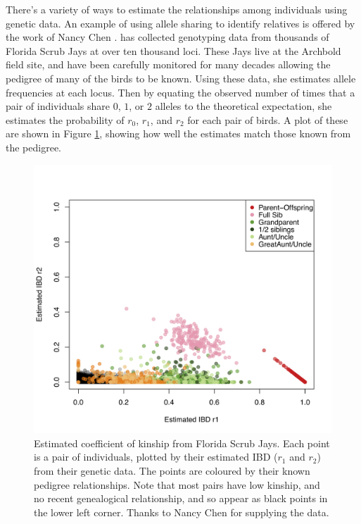 There's a variety of ways to estimate the relationships among
individuals using genetic data.  An example of using allele sharing to identify relatives is offered by
the work of Nancy Chen \citep[in collaboration with Stepfanie
Aguillon, see ][]{chen:16,Aguillon:17}. \citeauthor{chen:16} has collected genotyping data from thousands of
Florida Scrub Jays at over ten thousand loci. These Jays live at the
Archbold field site, and have been carefully monitored for many
decades allowing the pedigree of many of the birds to be known.
Using these data, she estimates allele frequencies at each
locus. Then by equating the observed number of times that a pair of
individuals share $0$, $1$, or $2$ alleles to the theoretical
expectation, she estimates the probability of $r_0$, $r_1$, and
$r_2$ for each pair of birds. A plot of these are shown in Figure
\ref{fig:FSJ_IBD}, showing how well the estimates match those known
from the pedigree.


\begin{figure}
\begin{center}
\includegraphics[width= 0.75 \textwidth]{figures/FSJ_IBD.jpg}
\end{center}
\caption[3cm]{Estimated coefficient
of kinship from Florida Scrub Jays. Each point is a pair of
individuals, plotted by their estimated IBD ($r_1$ and $r_2$) from their genetic data. The
points are coloured by their known pedigree relationships. Note that
most pairs have low kinship, and no recent genealogical relationship,
and so appear as black points in the lower left corner. Thanks to
Nancy Chen for supplying the data.  } \label{fig:FSJ_IBD}
\end{figure}

